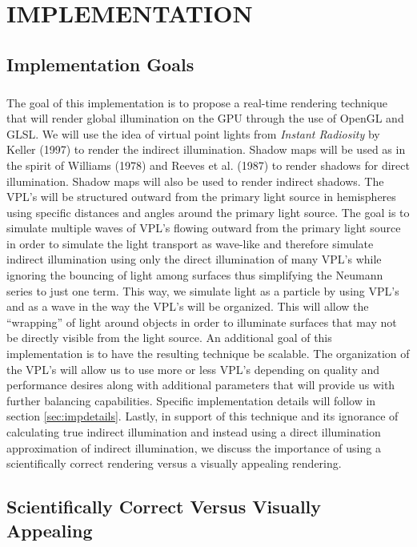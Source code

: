 \chapter{IMPLEMENTATION}

\section{Implementation Goals} \label{sec:impgoals}
\paragraph{}
The goal of this implementation is to propose a real-time rendering technique that will render global illumination on the GPU through the use of OpenGL and GLSL.  We will use the idea of virtual point lights from \textit{Instant Radiosity} by Keller (1997) to render the indirect illumination.  Shadow maps will be used as in the spirit of Williams (1978) and Reeves et al. (1987) to render shadows for direct illumination.  Shadow maps will also be used to render indirect shadows.  The VPL's will be structured outward from the primary light source in hemispheres using specific distances and angles around the primary light source. The goal is to simulate multiple waves of VPL's flowing outward from the primary light source in order to simulate the light transport as wave-like and therefore simulate indirect illumination using only the direct illumination of many VPL's while ignoring the bouncing of light among surfaces thus simplifying the Neumann series to just one term.  This way, we simulate light as a particle by using VPL's and as a wave in the way the VPL's will be organized.  This will allow the ``wrapping'' of light around objects in order to illuminate surfaces that may not be directly visible from the light source.  An additional goal of this implementation is to have the resulting technique be scalable.  The organization of the VPL's will allow us to use more or less VPL's depending on quality and performance desires along with additional parameters that will provide us with further balancing capabilities.  Specific implementation details will follow in section \ref{sec:impdetails}.  Lastly, in support of this technique and its ignorance of calculating true indirect illumination and instead using a direct illumination approximation of indirect illumination, we discuss the importance of using a scientifically correct rendering versus a visually appealing rendering.

\section{Scientifically Correct Versus Visually Appealing} \label{sec:study}
